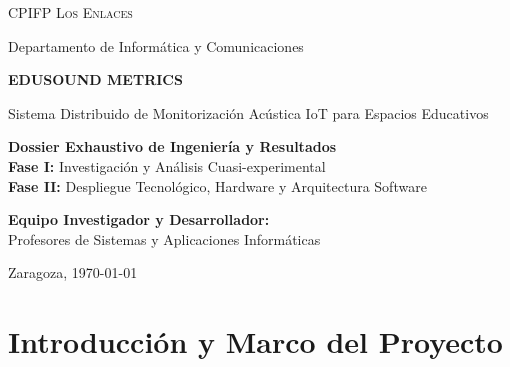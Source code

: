 \documentclass[11pt,a4paper]{article}
\begin{document}
\begin{titlepage}
    \pagecolor{CorpDark}
    \color{white}
    \centering
    \vspace*{2cm}
    
    {\Huge\textcolor{CorpAccent}{\faBroadcastTower}}\par
    \vspace{1cm}
    {\scshape\Large CPIFP Los Enlaces \par}
    \vspace{0.5cm}
    {\large Departamento de Informática y Comunicaciones\par}
    \vspace{3cm}
    
    {\Huge\bfseries EDUSOUND METRICS \par}
    \vspace{0.5cm}
    {\Large Sistema Distribuido de Monitorización Acústica IoT para Espacios Educativos \par}
    
    \vspace{2.5cm}
    \begin{tcolorbox}[
        colback=CorpDark!80!black, 
        colframe=CorpBlue,         
        coltext=white,             
        width=0.85\textwidth, 
        center, 
        arc=8pt, 
        boxrule=1.5pt,
        boxsep=10pt
    ]
        \centering
        \Large\textbf{Dossier Exhaustivo de Ingeniería y Resultados}\\
        \vspace{0.4cm}
        \large
        \textcolor{CorpAccent}{\textbf{Fase I:}} Investigación y Análisis Cuasi-experimental\\[0.2cm]
        \textcolor{CorpAccent}{\textbf{Fase II:}} Despliegue Tecnológico, Hardware y Arquitectura Software
    \end{tcolorbox}
    
    \vfill
    {\large \textbf{Equipo Investigador y Desarrollador:} \\ Profesores de Sistemas y Aplicaciones Informáticas \par}
    \vspace{1cm}
    {\large Zaragoza, \today \par}
\end{titlepage}
\nopagecolor 

\tableofcontents
\newpage

\section{Introducción y Marco del Proyecto}
\end{document}
